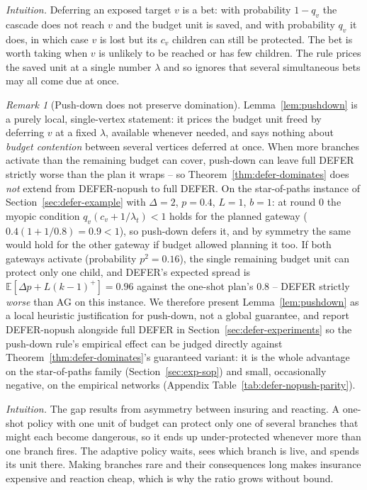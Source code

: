 \documentclass[11pt]{article}
\theoremstyle{definition}
\theoremstyle{remark}
\newtheorem{remark}{Remark}
\begin{document}
\emph{Intuition.} Deferring an exposed target $v$ is a bet: with
probability $1-q_v$ the cascade does not reach $v$ and the budget unit is
saved, and with probability $q_v$ it does, in which case $v$ is lost but its
$c_v$ children can still be protected. The bet is worth taking when $v$ is
unlikely to be reached or has few children. The rule prices the saved unit
at a single number $\lambda$ and so ignores that several simultaneous bets
may all come due at once.

\begin{remark}[Push-down does not preserve
domination]\label{rem:pushdown-counterexample}
Lemma~\ref{lem:pushdown} is a purely local, single-vertex statement: it
prices the budget unit freed by deferring $v$ at a fixed $\lambda$,
available whenever needed, and says nothing about \emph{budget contention}
between several vertices deferred at once. When more branches activate
than the remaining budget can cover, push-down can leave full DEFER
strictly worse than the plan it wraps -- so Theorem~\ref{thm:defer-dominates}
does \emph{not} extend from DEFER-nopush to full DEFER. On the
star-of-paths instance of Section~\ref{sec:defer-example} with $\Delta=2$,
$p=0.4$, $L=1$, $b=1$: at round $0$ the myopic condition
$q_v(c_v+1/\lambda_t)<1$ holds for the planned gateway
($0.4(1+1/0.8)=0.9<1$), so push-down defers it, and by symmetry the same
would hold for the other gateway if budget allowed planning it too. If
both gateways activate (probability $p^2=0.16$), the single remaining
budget unit can protect only one child, and DEFER's expected spread is
$\mathbb E[\Delta p+L(k-1)^+]=0.96$ against the one-shot plan's $0.8$
-- DEFER strictly \emph{worse} than AG on this instance. We
therefore present Lemma~\ref{lem:pushdown} as a local heuristic
justification for push-down, not a global guarantee, and report
DEFER-nopush alongside full DEFER in
Section~\ref{sec:defer-experiments} so the push-down rule's empirical
effect can be judged directly against Theorem~\ref{thm:defer-dominates}'s guaranteed variant: it is the whole advantage on the star-of-paths family (Section~\ref{sec:exp-sop}) and small, occasionally negative, on the empirical networks (Appendix Table~\ref{tab:defer-nopush-parity}).
\end{remark}

\emph{Intuition.} The gap results from asymmetry between insuring and
reacting. A one-shot policy with one unit of budget can protect only one of
several branches that might each become dangerous, so it ends up
under-protected whenever more than one branch fires. The adaptive policy waits,
sees which branch is live, and spends its unit there. Making branches rare
and their consequences long makes insurance expensive and reaction cheap,
which is why the ratio grows without bound.
\end{document}
